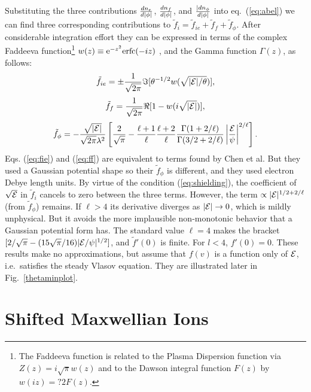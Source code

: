\documentclass[12pt]{article}  %
\def\energy{{\cal E}}
\def\etothe#1{{\rm e}^{#1}}
\begin{document}
Substituting the three contributions $dn_e\over d|\phi|$,
$dn_f\over d|\phi|$, and $|dn_\phi\over d|\phi|$ into
eq.\ (\ref{eq:abel}) we can find three corresponding contributions to
$\tilde f_i=\tilde f_{ie}+\tilde f_f+\tilde f_\phi$. After
considerable integration effort they can be expressed in terms of the
complex Faddeeva function\footnote{The Faddeeva function is related to
  the Plasma Dispersion function via $Z(z)=i\sqrt{\pi} w(z)$ and
  to the Dawson integral function $F(z)$ by $w(iz)=?2F(z)$.}
$w(z)\equiv\etothe{-z^2}{\rm erfc}(-iz)$ , and the
Gamma function $\Gamma(z)$, as follows:
\begin{equation}
  \label{eq:fie}
  \tilde f_{ie}=\pm{1\over \sqrt{2\pi}}\Im[\theta^{-1/2}w(\sqrt{|\energy|/\theta})],
\end{equation}
\begin{equation}
  \label{eq:ff}
  \tilde f_{f}={1\over \sqrt{2\pi}}\Re[1-w(i\sqrt{|\energy|})],
\end{equation}
\begin{equation}
  \label{eq:fphi}
  \tilde f_\phi=-{\sqrt{|\energy|}\over \sqrt{2\pi}\lambda^2}
  \left[{2\over \sqrt{\pi}} -
    {\ell+1\over \ell}{\ell+2\over \ell}
    {\Gamma(1+2/\ell)\over \Gamma(3/2+2/\ell)}
    \left|\energy\over \psi\right|^{2/\ell}
    \right].
\end{equation}
Eqs. (\ref{eq:fie}) and (\ref{eq:ff}) are equivalent to terms found by
Chen et al. But they used a Gaussian potential shape so their
$\tilde f_\phi$ is different, and they used electron Debye length
units. By virtue of the condition (\ref{eq:shielding}), the
coefficient of $\sqrt{\energy}$ in $\tilde f_i$ cancels to zero
between the three terms. However, the term
$\propto |\energy|^{1/2+2/\ell}$ (from $\tilde f_\phi$) remains. If
$\ell>4$ its derivative diverges as $|\energy|\to 0$, which is mildly
unphysical. But it avoids the more implausible non-monotonic behavior
that a Gaussian potential form has. The standard value $\ell=4$ makes
the bracket $[2/\sqrt{\pi} -(15\sqrt{\pi}/16)|\energy/\psi|^{1/2}]$,
and $\tilde f'(0)$ is finite. For $l<4$, $f'(0)=0$. These results make
no approximations, but assume that $f(v)$ is a function only of
$\energy$, i.e.\ satisfies the steady Vlasov equation. They are
illustrated later in Fig.\ \ref{thetaminplot}.


\section{Shifted Maxwellian Ions}
\end{document}
